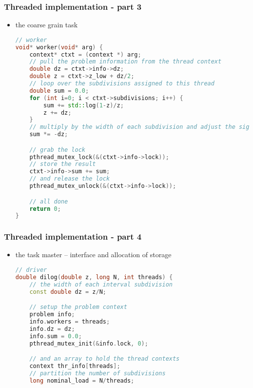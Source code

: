 \begin{frame}[fragile]
%
  \frametitle{Threaded implementation - part 3}
%
  \begin{itemize}
  \item the coarse grain task
  \begin{lstlisting}[language=c++,name=threaded]
// worker
void* worker(void* arg) {
    context* ctxt = (context *) arg;
    // pull the problem information from the thread context
    double dz = ctxt->info->dz;
    double z = ctxt->z_low + dz/2;
    // loop over the subdivisions assigned to this thread
    double sum = 0.0;
    for (int i=0; i < ctxt->subdivisions; i++) {
        sum += std::log(1-z)/z;
        z += dz;
    }
    // multiply by the width of each subdivision and adjust the sign
    sum *= -dz;

    // grab the lock
    pthread_mutex_lock(&(ctxt->info->lock));
    // store the result
    ctxt->info->sum += sum;
    // and release the lock
    pthread_mutex_unlock(&(ctxt->info->lock));

    // all done
    return 0;
}
  \end{lstlisting}
%
  \end{itemize}
%
\end{frame}

\begin{frame}[fragile]
%
  \frametitle{Threaded implementation - part 4}
%
  \begin{itemize}
  \item the task master -- interface and allocation of storage
  \begin{lstlisting}[language=c++,name=threaded]
// driver
double dilog(double z, long N, int threads) {
    // the width of each interval subdivision
    const double dz = z/N;

    // setup the problem context
    problem info;
    info.workers = threads;
    info.dz = dz;
    info.sum = 0.0;
    pthread_mutex_init(&info.lock, 0);

    // and an array to hold the thread contexts
    context thr_info[threads];
    // partition the number of subdivisions
    long nominal_load = N/threads;

  \end{lstlisting}
%
  \end{itemize}
%
\end{frame}

